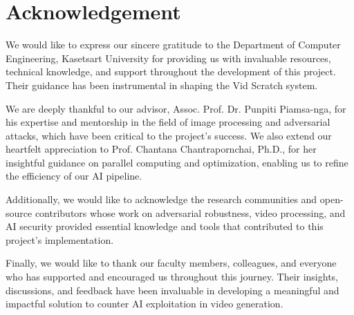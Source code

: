 \chapter*{Acknowledgement}
\label{chap:acknowledgement}

We would like to express our sincere gratitude to the Department of Computer Engineering, Kasetsart University for providing us with invaluable resources, technical knowledge, and support throughout the development of this project. Their guidance has been instrumental in shaping the Vid Scratch system.

We are deeply thankful to our advisor, Assoc. Prof. Dr. Punpiti Piamsa-nga, for his expertise and mentorship in the field of image processing and adversarial attacks, which have been critical to the project's success. We also extend our heartfelt appreciation to Prof. Chantana Chantrapornchai, Ph.D., for her insightful guidance on parallel computing and optimization, enabling us to refine the efficiency of our AI pipeline.

Additionally, we would like to acknowledge the research communities and open-source contributors whose work on adversarial robustness, video processing, and AI security provided essential knowledge and tools that contributed to this project’s implementation.

Finally, we would like to thank our faculty members, colleagues, and everyone who has supported and encouraged us throughout this journey. Their insights, discussions, and feedback have been invaluable in developing a meaningful and impactful solution to counter AI exploitation in video generation.


\vspace{.2in}
\begin{flushright}
    \usevar{\srsAuthorOne} \\
    \usevar{\srsAuthorTwo} \\
\end{flushright}